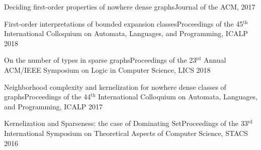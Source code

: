 
\setcounter{pcount}{1}

\begin{footnotesize}

{Deciding first-order properties of nowhere dense graphs}{Journal of the ACM, 2017}

{First-order interpretations of bounded expansion classes}{Proceedings of the 45$^{\text{th}}$ International Colloquium on Automata, Languages, and Programming, ICALP 2018}

{On the number of types in sparse graphs}{Proceedings of the 23$^{\textrm{rd}}$ Annual ACM/IEEE Symposium on Logic in Computer Science, LICS 2018}


{Neighborhood complexity and kernelization for nowhere dense classes of graphs}{Proceedings of the 44$^{\text{th}}$ International Colloquium on Automata, Languages, and Programming, ICALP 2017}

{Kernelization and Sparseness: the case of Dominating Set}{Proceedings of the 33$^{\textrm{rd}}$ International Symposium on Theoretical Aspects of Computer Science, STACS 2016}
\end{footnotesize}

\vfill
\vfill
\vfill
\vfill
\vfill
\vfill
\vfill
\vfill
\vfill
\vfill
\vfill
\vfill